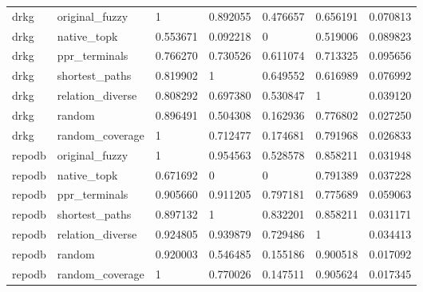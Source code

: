 \begin{tabular}{lllllll}
drkg & original\_fuzzy & 1 & 0.892055 & 0.476657 & 0.656191 & 0.070813 \\
drkg & native\_topk & 0.553671 & 0.092218 & 0 & 0.519006 & 0.089823 \\
drkg & ppr\_terminals & 0.766270 & 0.730526 & 0.611074 & 0.713325 & 0.095656 \\
drkg & shortest\_paths & 0.819902 & 1 & 0.649552 & 0.616989 & 0.076992 \\
drkg & relation\_diverse & 0.808292 & 0.697380 & 0.530847 & 1 & 0.039120 \\
drkg & random & 0.896491 & 0.504308 & 0.162936 & 0.776802 & 0.027250 \\
drkg & random\_coverage & 1 & 0.712477 & 0.174681 & 0.791968 & 0.026833 \\
repodb & original\_fuzzy & 1 & 0.954563 & 0.528578 & 0.858211 & 0.031948 \\
repodb & native\_topk & 0.671692 & 0 & 0 & 0.791389 & 0.037228 \\
repodb & ppr\_terminals & 0.905660 & 0.911205 & 0.797181 & 0.775689 & 0.059063 \\
repodb & shortest\_paths & 0.897132 & 1 & 0.832201 & 0.858211 & 0.031171 \\
repodb & relation\_diverse & 0.924805 & 0.939879 & 0.729486 & 1 & 0.034413 \\
repodb & random & 0.920003 & 0.546485 & 0.155186 & 0.900518 & 0.017092 \\
repodb & random\_coverage & 1 & 0.770026 & 0.147511 & 0.905624 & 0.017345 \\
\hline
\end{tabular}